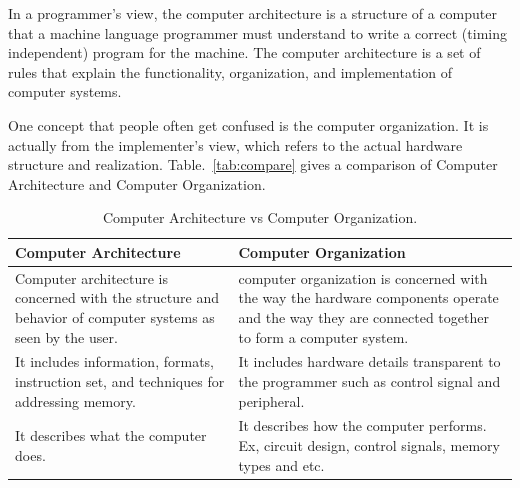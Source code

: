 \documentclass[doc,natbib,12pt]{apa6}
\begin{document}
	In a programmer's view, the computer architecture is a structure of a computer that a machine language programmer must understand to write a correct (timing independent) program for the machine. The computer architecture is a set of rules that explain the functionality, organization, and implementation of computer systems. \citep{Shrestha2014}
	
	One concept that people often get confused is the computer organization. It is actually from the implementer's view, which refers to the actual hardware structure and realization. Table.~\vref{tab:compare} gives a comparison of Computer Architecture and Computer Organization.
	
	\begin{table}[htpb]
		\centering
		\begin{tabular}{p{2in}|p{2in}}
			Computer Architecture & Computer Organization \\\hline
			Computer architecture is concerned with the structure and behavior of computer systems as seen by the user. & computer organization is concerned with the way the hardware components operate and the way they are connected together to form a computer system. \\
			It includes information, formats, instruction set, and techniques for addressing memory. & It includes hardware details transparent to the programmer such as control signal and peripheral. \\
			It describes what the computer does. & It describes how the computer performs. Ex, circuit design, control signals, memory types and etc.
		\end{tabular}
		\caption{\label{tab:compare}Computer Architecture vs Computer Organization. \citep{Shrestha2014}}
	\end{table}
	
\end{document}
